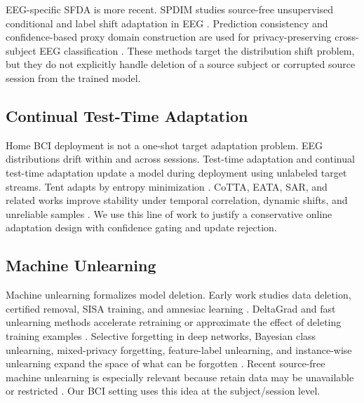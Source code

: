 \documentclass[10pt,twocolumn]{article}
\begin{document}
EEG-specific SFDA is more recent. SPDIM studies source-free unsupervised conditional and label shift adaptation in EEG \cite{li2025spdim}. Prediction consistency and confidence-based proxy domain construction are used for privacy-preserving cross-subject EEG classification \cite{peng2025pdcc}. These methods target the distribution shift problem, but they do not explicitly handle deletion of a source subject or corrupted source session from the trained model.

\subsection{Continual Test-Time Adaptation}
Home BCI deployment is not a one-shot target adaptation problem. EEG distributions drift within and across sessions. Test-time adaptation and continual test-time adaptation update a model during deployment using unlabeled target streams. Tent adapts by entropy minimization \cite{wang2021tent}. CoTTA, EATA, SAR, and related works improve stability under temporal correlation, dynamic shifts, and unreliable samples \cite{wang2022cotta,niu2022eata,niu2023sar}. We use this line of work to justify a conservative online adaptation design with confidence gating and update rejection.

\subsection{Machine Unlearning}
Machine unlearning formalizes model deletion. Early work studies data deletion, certified removal, SISA training, and amnesiac learning \cite{ginart2019making,guo2020certified,bourtoule2021machine,graves2021amnesiac}. DeltaGrad and fast unlearning methods accelerate retraining or approximate the effect of deleting training examples \cite{wu2020deltagrad}. Selective forgetting in deep networks, Bayesian class unlearning, mixed-privacy forgetting, feature-label unlearning, and instance-wise unlearning expand the space of what can be forgotten \cite{golatkar2020eternal,warnecke2023features}. Recent source-free machine unlearning is especially relevant because retain data may be unavailable or restricted \cite{ahmed2025sourcefree}. Our BCI setting uses this idea at the subject/session level.
\end{document}
